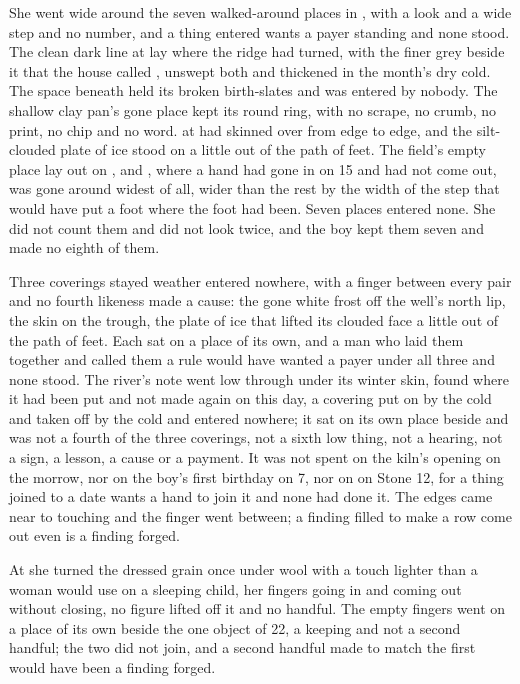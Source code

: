 She went wide around the seven walked-around places in , with a look and a wide step and no number, and a thing entered wants a payer standing and none stood. The clean dark line at  lay where the ridge had turned, with the finer grey beside it that the house called , unswept both and thickened in the month's dry cold. The space beneath  held its broken birth-slates and was entered by nobody. The shallow clay pan's gone place kept its round ring, with no scrape, no crumb, no print, no chip and no word.  at  had skinned over from edge to edge, and the silt-clouded plate of ice stood on  a little out of the path of feet. The field's empty place lay out on , and , where a hand had gone in on  15 and had not come out, was gone around widest of all, wider than the rest by the width of the step that would have put a foot where the foot had been. Seven places entered none. She did not count them and did not look twice, and the boy kept them seven and made no eighth of them.

Three coverings stayed weather entered nowhere, with a finger between every pair and no fourth likeness made a cause: the gone white frost off the well's north lip, the skin on the trough, the plate of ice that lifted its clouded face a little out of the path of feet. Each sat on a place of its own, and a man who laid them together and called them a rule would have wanted a payer under all three and none stood. The river's note went low through  under its winter skin, found where it had been put and not made again on this day, a covering put on by the cold and taken off by the cold and entered nowhere; it sat on its own place beside  and was not a fourth of the three coverings, not a sixth low thing, not a hearing, not a sign, a lesson, a cause or a payment. It was not spent on the kiln's opening on the morrow, nor on the boy's first birthday on  7, nor on  on Stone 12, for a thing joined to a date wants a hand to join it and none had done it. The edges came near to touching and the finger went between; a finding filled to make a row come out even is a finding forged.

At  she turned the dressed grain once under wool with a touch lighter than a woman would use on a sleeping child, her fingers going in and coming out without closing, no figure lifted off it and no handful. The empty fingers went on a place of its own beside the one object of  22, a keeping and not a second handful; the two did not join, and a second handful made to match the first would have been a finding forged.

